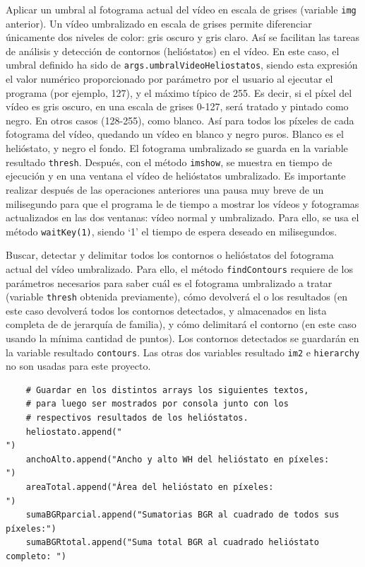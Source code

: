Aplicar un umbral al fotograma actual del vídeo en escala de grises (variable \verb|img| anterior). Un vídeo umbralizado en escala de grises permite diferenciar únicamente dos niveles de color: gris oscuro y gris claro. Así se facilitan las tareas de análisis y detección de contornos (helióstatos) en el vídeo. En este caso, el umbral definido ha sido de \verb|args.umbralVideoHeliostatos|, siendo esta expresión el valor numérico proporcionado por parámetro por el usuario al ejecutar el programa (por ejemplo, 127), y el máximo típico de 255. Es decir, si el píxel del vídeo es gris oscuro, en una escala de grises 0-127, será tratado y pintado como negro. En otros casos (128-255), como blanco. Así para todos los píxeles de cada fotograma del vídeo, quedando un vídeo en blanco y negro puros. Blanco es el helióstato, y negro el fondo. El fotograma umbralizado se guarda en la variable resultado \verb|thresh|. Después, con el método \verb|imshow|, se muestra en tiempo de ejecución y en una ventana el vídeo de helióstatos umbralizado. Es importante realizar después de las operaciones anteriores una pausa muy breve de un milisegundo para que el programa le de tiempo a mostrar los vídeos y fotogramas actualizados en las dos ventanas: vídeo normal y umbralizado. Para ello, se usa el método \verb|waitKey(1)|, siendo ‘1’ el tiempo de espera deseado en milisegundos.

Buscar, detectar y delimitar todos los contornos o helióstatos del fotograma actual del vídeo umbralizado. Para ello, el método \verb|findContours| requiere de los parámetros necesarios para saber cuál es el fotograma umbralizado a tratar (variable \verb|thresh| obtenida previamente), cómo devolverá el o los resultados (en este caso devolverá todos los contornos detectados, y almacenados en lista completa de de jerarquía de familia), y cómo delimitará el contorno (en este caso usando la mínima cantidad de puntos). Los contornos detectados se guardarán en la variable resultado \verb|contours|. Las otras dos variables resultado \verb|im2| e \verb|hierarchy| no son usadas para este proyecto.

\begin{lstlisting}
	# Guardar en los distintos arrays los siguientes textos,
	# para luego ser mostrados por consola junto con los
	# respectivos resultados de los helióstatos.
    heliostato.append("                                               ")
    anchoAlto.append("Ancho y alto WH del helióstato en píxeles:      ")
    areaTotal.append("Área del helióstato en píxeles:                 ")
    sumaBGRparcial.append("Sumatorias BGR al cuadrado de todos sus píxeles:")
    sumaBGRtotal.append("Suma total BGR al cuadrado helióstato completo: ")
\end{lstlisting}
    
